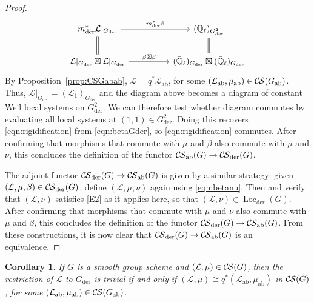 \documentclass[10pt]{amsart}
\theoremstyle{plain}
\newtheorem{corollary}[theorem]{Corollary}
\theoremstyle{definition}
\newcommand{\EE}{\mathbb{\bar Q}_\ell}
\DeclareMathOperator{\Loc}{Loc}
\newcommand{\der}{_{\operatorname{der}}}
\newcommand{\ab}{_{\operatorname{ab}}}
\newcommand{\cs}[1]{{\mathcal{#1}}}
\newcommand{\CS}{{\mathcal{C\hskip-0.8pt S}}}
\begin{document}
\begin{proof}
\begin{equation}\label{eqn:betaGder}
\begin{tikzcd}
m\der^*\cs{L}\vert_{G\der} \arrow{rr}{m\der^* \beta} \arrow[equal]{d} && \arrow[equal]{d} (\EE)_{G\der^2}\\
\cs{L}\vert_{G\der} \boxtimes \cs{L}\vert_{G\der} \arrow{rr}{\beta\boxtimes\beta} &&  (\EE)_{G\der}\boxtimes (\EE)_{G\der} 
\end{tikzcd}
\end{equation}
By Proposition~\ref{prop:CSGabab}, $\cs{L} = q^*\cs{L}\ab$, for some $(\cs{L}\ab,\mu\ab)\in \CS(G\ab)$.
Thus, $\cs{L}\vert_{G\der} = (\cs{L}_1)_{G\der}$ and the diagram above becomes a diagram of constant Weil local systems on $G\der^2$.
We can therefore test  whether  diagram commutes by evaluating all local systems at $(1,1)\in G\der^2$.  Doing this recovers \eqref{eqn:rigidification} from \eqref{eqn:betaGder}, so \eqref{eqn:rigidification} commutes.
%
After confirming that morphisms that commute with $\mu$ and $\beta$ also commute with $\mu$ and $\nu$, this concludes the definition of the functor  $\CS\ab(G) \to \CS\der(G)$.


The adjoint functor $\CS\der(G) \to \CS\ab(G)$ is given by a  similar  strategy: given $(\cs{L},\mu,\beta)\in \CS\der(G)$, define $(\cs{L},\mu,\nu)$ again using  \eqref{eqn:betanu}.
Then and verify that $(\cs{L},\nu)$ satisfies \eqref{E2} as it applies here, so that $(\cs{L},\nu)\in \Loc\der(G)$.
After confirming that morphisms that commute with $\mu$ and $\nu$ also commute with $\mu$ and $\beta$, this concludes the definition of the functor  $\CS\der(G) \to \CS\ab(G)$.
From these constructions,  it is now clear that $\CS\der(G) \to \CS\ab(G)$ is an equivalence.
\end{proof}

\begin{corollary} 
If $G$ is a smooth group scheme and $(\cs{L},\mu) \in \CS(G)$, then
the restriction of $\cs{L}$ to $G\der$ is trivial if and only if $(\cs{L},\mu) \cong q^*(\cs{L}\ab,\mu\ab)$ in $\CS(G)$, for some $(\cs{L}\ab,\mu\ab) \in \CS(G\ab)$.
\end{corollary}
\end{document}
